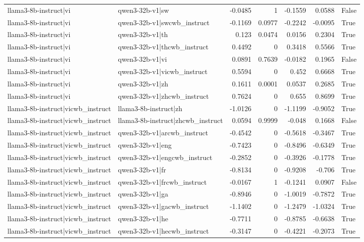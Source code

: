 \begin{table}
\begin{tabular}{l l r r r r l}
llama3-8b-instruct|vi & qwen3-32b-v1|sw & -0.0485 & 1 & -0.1559 & 0.0588 & False \\
llama3-8b-instruct|vi & qwen3-32b-v1|swcwb_instruct & -0.1169 & 0.0977 & -0.2242 & -0.0095 & True \\
llama3-8b-instruct|vi & qwen3-32b-v1|th & 0.123 & 0.0474 & 0.0156 & 0.2304 & True \\
llama3-8b-instruct|vi & qwen3-32b-v1|thcwb_instruct & 0.4492 & 0 & 0.3418 & 0.5566 & True \\
llama3-8b-instruct|vi & qwen3-32b-v1|vi & 0.0891 & 0.7639 & -0.0182 & 0.1965 & False \\
llama3-8b-instruct|vi & qwen3-32b-v1|vicwb_instruct & 0.5594 & 0 & 0.452 & 0.6668 & True \\
llama3-8b-instruct|vi & qwen3-32b-v1|zh & 0.1611 & 0.0001 & 0.0537 & 0.2685 & True \\
llama3-8b-instruct|vi & qwen3-32b-v1|zhcwb_instruct & 0.7624 & 0 & 0.655 & 0.8699 & True \\
llama3-8b-instruct|vicwb_instruct & llama3-8b-instruct|zh & -1.0126 & 0 & -1.1199 & -0.9052 & True \\
llama3-8b-instruct|vicwb_instruct & llama3-8b-instruct|zhcwb_instruct & 0.0594 & 0.9999 & -0.048 & 0.1668 & False \\
llama3-8b-instruct|vicwb_instruct & qwen3-32b-v1|arcwb_instruct & -0.4542 & 0 & -0.5618 & -0.3467 & True \\
llama3-8b-instruct|vicwb_instruct & qwen3-32b-v1|eng & -0.7423 & 0 & -0.8496 & -0.6349 & True \\
llama3-8b-instruct|vicwb_instruct & qwen3-32b-v1|engcwb_instruct & -0.2852 & 0 & -0.3926 & -0.1778 & True \\
llama3-8b-instruct|vicwb_instruct & qwen3-32b-v1|fr & -0.8134 & 0 & -0.9208 & -0.706 & True \\
llama3-8b-instruct|vicwb_instruct & qwen3-32b-v1|frcwb_instruct & -0.0167 & 1 & -0.1241 & 0.0907 & False \\
llama3-8b-instruct|vicwb_instruct & qwen3-32b-v1|ga & -0.8946 & 0 & -1.0019 & -0.7872 & True \\
llama3-8b-instruct|vicwb_instruct & qwen3-32b-v1|gacwb_instruct & -1.1402 & 0 & -1.2479 & -1.0324 & True \\
llama3-8b-instruct|vicwb_instruct & qwen3-32b-v1|he & -0.7711 & 0 & -0.8785 & -0.6638 & True \\
llama3-8b-instruct|vicwb_instruct & qwen3-32b-v1|hecwb_instruct & -0.3147 & 0 & -0.4221 & -0.2073 & True \\

\end{tabular}
\end{table}
